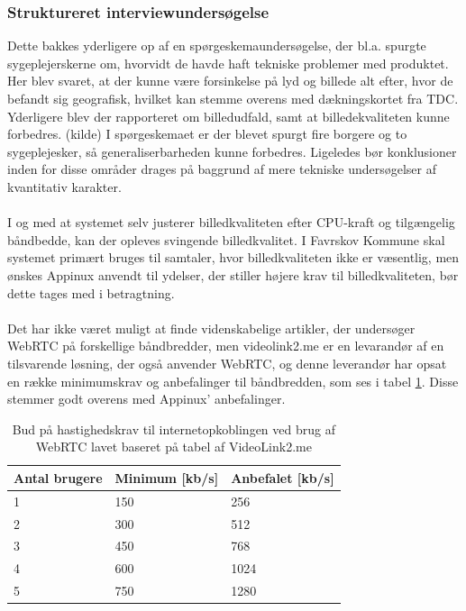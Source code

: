\subsubsection{Struktureret interviewundersøgelse}
Dette bakkes yderligere op af en spørgeskemaundersøgelse, der bl.a. spurgte sygeplejerskerne om, hvorvidt de havde haft tekniske problemer med produktet. Her blev svaret, at der kunne være forsinkelse på lyd og billede alt efter, hvor de befandt sig geografisk, hvilket kan stemme overens med dækningskortet fra TDC.\\Yderligere blev der rapporteret om billedudfald, samt at billedekvaliteten kunne forbedres. (kilde) I spørgeskemaet er der blevet spurgt fire borgere og to sygeplejesker, så generaliserbarheden kunne forbedres. Ligeledes bør konklusioner inden for disse områder drages på baggrund af mere tekniske undersøgelser af kvantitativ karakter.\\ \\
I og med at systemet selv justerer billedkvaliteten efter CPU-kraft og tilgængelig båndbedde, kan der opleves svingende billedkvalitet. I Favrskov Kommune skal systemet primært bruges til samtaler, hvor billedkvaliteten ikke er væsentlig, men ønskes Appinux anvendt til ydelser, der stiller højere krav til billedkvaliteten, bør dette tages med i betragtning.
\\ \\
Det har ikke været muligt at finde videnskabelige artikler, der undersøger WebRTC på forskellige båndbredder, men videolink2.me er en levarandør af en tilsvarende løsning, der også anvender WebRTC, og denne leverandør har opsat en række minimumskrav og anbefalinger til båndbredden, som ses i tabel \ref{tab:hastighedtabel}. Disse stemmer godt overens med Appinux' anbefalinger.
\begin{table}[H]
\caption{Bud på hastighedskrav til internetopkoblingen ved brug af WebRTC lavet baseret på tabel af VideoLink2.me\cite{videolink2me}}
\label{tab:hastighedtabel}
\centering
\begin{tabular}{|l|l|l|}
\hline
\cellcolor{blue!25}\textbf{Antal brugere} & \cellcolor{blue!25}\textbf{Minimum} [kb/s]  & \cellcolor{blue!25}\textbf{Anbefalet}  [kb/s] \\ \hline
1             & 150          & 256          \\ \hline
2             & 300          & 512          \\ \hline
3             & 450          & 768          \\ \hline
4             & 600          & 1024          \\ \hline
5             & 750          & 1280          \\ \hline
\end{tabular}

\end{table}
